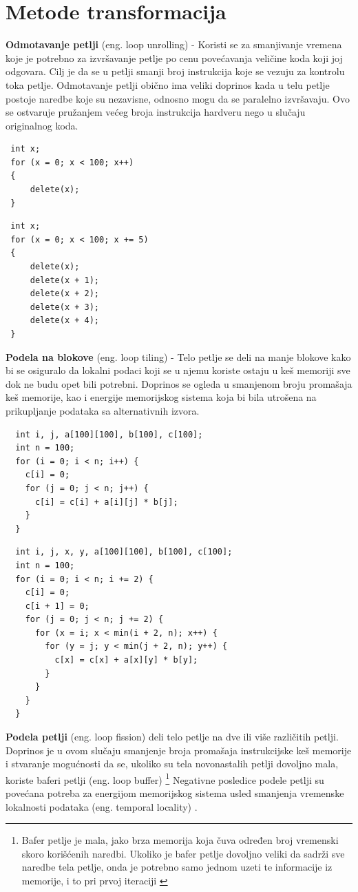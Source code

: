 \documentclass[a4paper]{article}
\begin{document}
{\section{Metode transformacija}
\label{sec:transformacije}

\textbf{Odmotavanje petlji} (eng. loop unrolling) - Koristi se za smanjivanje vremena koje je potrebno za
izvršavanje petlje po cenu povećavanja veličine koda koji joj odgovara. Cilj je da se u petlji
smanji broj instrukcija koje se vezuju za kontrolu toka petlje. Odmotavanje petlji obično ima
veliki doprinos kada u telu petlje postoje naredbe koje su nezavisne, odnosno mogu da se
paralelno izvršavaju. Ovo se ostvaruje pružanjem većeg broja instrukcija hardveru nego u 
slučaju originalnog koda.

\begin{lstlisting}
 int x;
 for (x = 0; x < 100; x++)
 {
     delete(x);
 }
\end{lstlisting}

\begin{lstlisting}
 int x; 
 for (x = 0; x < 100; x += 5)
 {
     delete(x);
     delete(x + 1);
     delete(x + 2);
     delete(x + 3);
     delete(x + 4);
 }
\end{lstlisting}


\textbf{Podela na blokove} (eng. loop tiling) - Telo petlje se deli na manje blokove kako bi se osiguralo
da lokalni podaci koji se u njemu koriste ostaju u keš memoriji sve dok ne budu opet bili potrebni.
Doprinos se ogleda u smanjenom broju promašaja keš memorije, kao i energije memorijskog sistema koja
bi bila utrošena na prikupljanje podataka sa alternativnih izvora.

\begin{lstlisting}
  int i, j, a[100][100], b[100], c[100];
  int n = 100;
  for (i = 0; i < n; i++) {
    c[i] = 0;
    for (j = 0; j < n; j++) {
      c[i] = c[i] + a[i][j] * b[j];
    }
  }
\end{lstlisting}

\begin{lstlisting}
  int i, j, x, y, a[100][100], b[100], c[100];
  int n = 100;
  for (i = 0; i < n; i += 2) {
    c[i] = 0;
    c[i + 1] = 0;
    for (j = 0; j < n; j += 2) {
      for (x = i; x < min(i + 2, n); x++) {
        for (y = j; y < min(j + 2, n); y++) {
          c[x] = c[x] + a[x][y] * b[y];
        }
      }
    }
  }
\end{lstlisting}

\textbf{Podela petlji} (eng. loop fission) deli telo petlje na dve ili više različitih petlji. Doprinos je u ovom slučaju smanjenje broja promašaja instrukcijske keš memorije i stvaranje mogućnosti da se, ukoliko su tela novonastalih petlji dovoljno mala, koriste baferi petlji (eng. loop buffer) \footnote{Bafer petlje je mala, jako brza memorija koja čuva određen broj vremenski skoro korišćenih naredbi. Ukoliko je bafer petlje dovoljno veliki da sadrži sve naredbe tela petlje, onda je potrebno samo jednom uzeti te informacije iz memorije, i to pri prvoj iteraciji \cite{stallings2000computer}} Negativne posledice podele petlji su povećana potreba za energijom memorijskog sistema usled smanjenja vremenske lokalnosti podataka (eng. temporal locality) .


}
\end{document}
